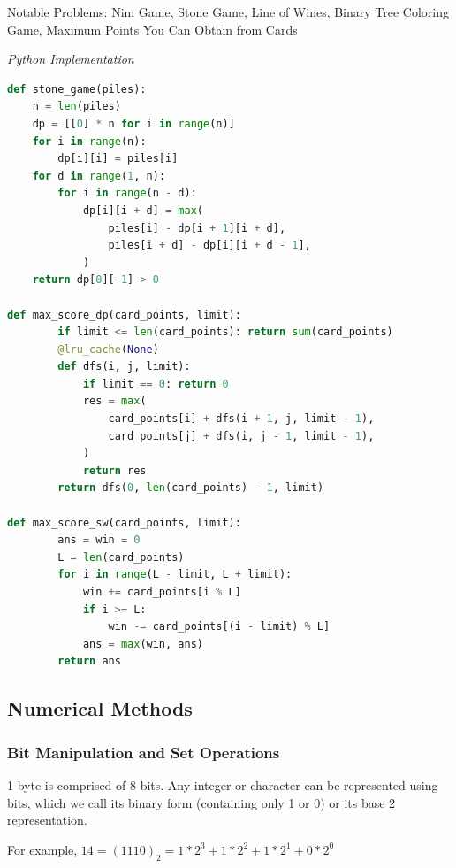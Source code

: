 \documentclass{article}
\begin{document}
Notable Problems: Nim Game, Stone Game, Line of Wines, Binary Tree Coloring Game, Maximum Points You Can Obtain from Cards

\vspace{8pt} \emph{Python Implementation}
\begin{lstlisting}[language=Python]
def stone_game(piles):
    n = len(piles)
    dp = [[0] * n for i in range(n)]
    for i in range(n):
        dp[i][i] = piles[i]
    for d in range(1, n):
        for i in range(n - d):
            dp[i][i + d] = max(
                piles[i] - dp[i + 1][i + d],
                piles[i + d] - dp[i][i + d - 1],
            )
    return dp[0][-1] > 0

def max_score_dp(card_points, limit):
        if limit <= len(card_points): return sum(card_points)
        @lru_cache(None)
        def dfs(i, j, limit):
            if limit == 0: return 0
            res = max(
                card_points[i] + dfs(i + 1, j, limit - 1), 
                card_points[j] + dfs(i, j - 1, limit - 1),
            )
            return res
        return dfs(0, len(card_points) - 1, limit)
        
def max_score_sw(card_points, limit):
        ans = win = 0
        L = len(card_points)
        for i in range(L - limit, L + limit):
            win += card_points[i % L]
            if i >= L:
                win -= card_points[(i - limit) % L]
            ans = max(win, ans)    
        return ans
\end{lstlisting}

    \subsection{Numerical Methods}
    
    \subsubsection{Bit Manipulation and Set Operations}
    1 byte is comprised of 8 bits. Any integer or character can be represented using bits, which we call its binary form (containing only 1 or 0) or its base 2 representation.
    
    For example, $14 = (1110)_2 = 1 * 2^3 + 1 * 2^2 + 1 * 2^1 + 0 * 2^0$  
    
\end{document}
